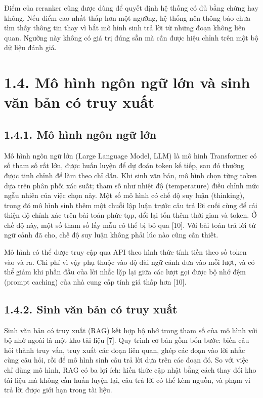 Điểm của reranker cũng được dùng để quyết định hệ thống có đủ bằng chứng hay không. Nếu điểm cao nhất thấp hơn một ngưỡng, hệ thống nên thông báo chưa tìm thấy thông tin thay vì bắt mô hình sinh trả lời từ những đoạn không liên quan. Ngưỡng này không có giá trị đúng sẵn mà cần được hiệu chỉnh trên một bộ dữ liệu đánh giá.


\section{1.4. Mô hình ngôn ngữ lớn và sinh văn bản có truy xuất}

\subsection{1.4.1. Mô hình ngôn ngữ lớn}

Mô hình ngôn ngữ lớn (Large Language Model, LLM) là mô hình Transformer có số tham số rất lớn, được huấn luyện để dự đoán token kế tiếp, sau đó thường được tinh chỉnh để làm theo chỉ dẫn. Khi sinh văn bản, mô hình chọn từng token dựa trên phân phối xác suất; tham số như nhiệt độ (temperature) điều chỉnh mức ngẫu nhiên của việc chọn này. Một số mô hình có chế độ suy luận (thinking), trong đó mô hình sinh thêm một chuỗi lập luận trước câu trả lời cuối cùng để cải thiện độ chính xác trên bài toán phức tạp, đổi lại tốn thêm thời gian và token. Ở chế độ này, một số tham số lấy mẫu có thể bị bỏ qua [10]. Với bài toán trả lời từ ngữ cảnh đã cho, chế độ suy luận không phải lúc nào cũng cần thiết.


Mô hình có thể được truy cập qua API theo hình thức tính tiền theo số token vào và ra. Chi phí vì vậy phụ thuộc vào độ dài ngữ cảnh đưa vào mỗi lượt, và có thể giảm khi phần đầu của lời nhắc lặp lại giữa các lượt gọi được bộ nhớ đệm (prompt caching) của nhà cung cấp tính giá thấp hơn [10].


\subsection{1.4.2. Sinh văn bản có truy xuất}

Sinh văn bản có truy xuất (RAG) kết hợp bộ nhớ trong tham số của mô hình với bộ nhớ ngoài là một kho tài liệu [7]. Quy trình cơ bản gồm bốn bước: biến câu hỏi thành truy vấn, truy xuất các đoạn liên quan, ghép các đoạn vào lời nhắc cùng câu hỏi, rồi để mô hình sinh câu trả lời dựa trên các đoạn đó. So với việc chỉ dùng mô hình, RAG có ba lợi ích: kiến thức cập nhật bằng cách thay đổi kho tài liệu mà không cần huấn luyện lại, câu trả lời có thể kèm nguồn, và phạm vi trả lời được giới hạn trong tài liệu.


